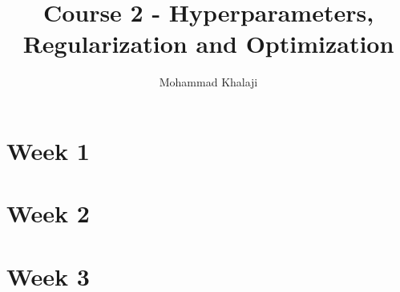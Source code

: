 \documentclass[10pt,a4paper]{article}
\author{Mohammad Khalaji}
\title{Course 2 - Hyperparameters, Regularization and Optimization}
\begin{document}
\maketitle
\section{Week 1}

\newpage
\section{Week 2}

\newpage
\section{Week 3}

\end{document}
